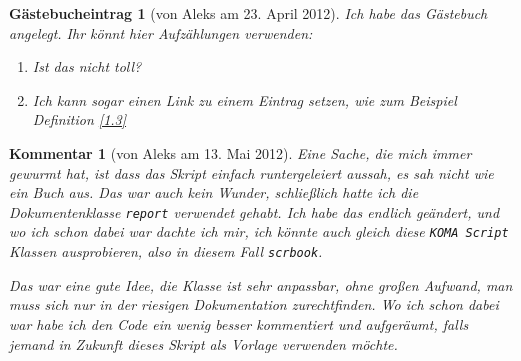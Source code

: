 \documentclass[paper = A4, fontsize=12pt, numbers=noendperiod, chapterprefix=true]{scrbook}
\theoremstyle{break}
\theoremstyle{nonumberbreak}
\newtheorem{gast}{G\"astebucheintrag}
\newtheorem{komm}{Kommentar}
\theoremstyle{nonumberplain}
\begin{document}
\begin{gast}[von Aleks am 23. April 2012]
Ich habe das G\"astebuch angelegt. Ihr k\"onnt hier Aufz\"ahlungen verwenden:
\begin{enumerate}[1)]
\item
  Ist das nicht toll?
\item
  Ich kann sogar einen Link zu einem Eintrag setzen, wie zum Beispiel Definition \ref{1.3}
\end{enumerate}
\end{gast}

\begin{komm}[von Aleks am 13. Mai 2012]
Eine Sache, die mich immer gewurmt hat, ist dass das Skript einfach runtergeleiert aussah, es sah nicht wie ein Buch aus. Das war auch kein Wunder, schlie\ss lich hatte ich die Dokumentenklasse \verb!report! verwendet gehabt. Ich habe das endlich ge\"andert, und wo ich schon dabei war dachte ich mir, ich k\"onnte auch gleich diese \verb!KOMA Script! Klassen ausprobieren, also in diesem Fall \verb!scrbook!.

Das war eine gute Idee, die Klasse ist sehr anpassbar, ohne gro\ss en Aufwand, man muss sich nur in der riesigen Dokumentation zurechtfinden. Wo ich schon dabei war habe ich den Code ein wenig besser kommentiert und aufger\"aumt, falls jemand in Zukunft dieses Skript als Vorlage verwenden m\"ochte.
\end{komm}
\end{document}
